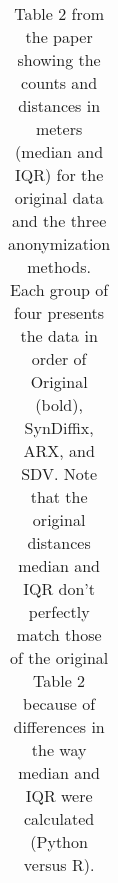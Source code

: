 \begin{table}
\begin{center}
\begin{small}
\begin{tabular}{lllll}
      \bottomrule
      \end{tabular}
      \end{small}
      \caption{Table 2 from the paper showing the counts and distances in meters (median and IQR) for the original data and the three anonymization methods. Each group of four presents the data in order of Original (bold), SynDiffix, ARX, and SDV. Note that the original distances median and IQR don't perfectly match those of the original Table 2 because of differences in the way median and IQR were calculated (Python versus R).}
      \label{tab:table2}
      \end{center}
      \end{table}
    